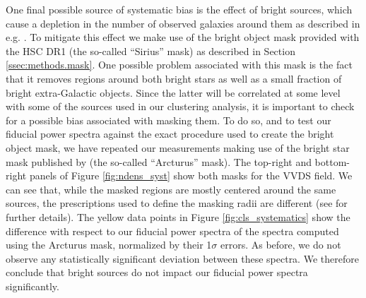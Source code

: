 \documentclass[a4paper,11pt]{article}
\begin{document}
      One final possible source of systematic bias is the effect of bright sources, which cause a depletion in the number of observed galaxies around them as described in e.g. \cite{2018PASJ...70S...7C}. To mitigate this effect we make use of the bright object mask provided with the HSC DR1 (the so-called ``Sirius'' mask) as described in Section \ref{ssec:methods.mask}. One possible problem associated with this mask is the fact that it removes regions around both bright stars as well as a small fraction of bright extra-Galactic objects. Since the latter will be correlated at some level with some of the sources used in our clustering analysis, it is important to check for a possible bias associated with masking them. To do so, and to test our fiducial power spectra against the exact procedure used to create the bright object mask, we have repeated our measurements making use of the bright star mask published by \cite{2018PASJ...70S...7C} (the so-called ``Arcturus'' mask). The top-right and bottom-right panels of Figure \ref{fig:ndens_syst} show both masks for the VVDS field. We can see that, while the masked regions are mostly centered around the same sources, the prescriptions used to define the masking radii are different (see \cite{2018PASJ...70S...7C} for further details). The yellow data points in Figure \ref{fig:cls_systematics} show the difference with respect to our fiducial power spectra of the spectra computed using the Arcturus mask, normalized by their 1$\sigma$ errors. As before, we do not observe any statistically significant deviation between these spectra. We therefore conclude that bright sources do not impact our fiducial power spectra significantly. 
      
\end{document}
